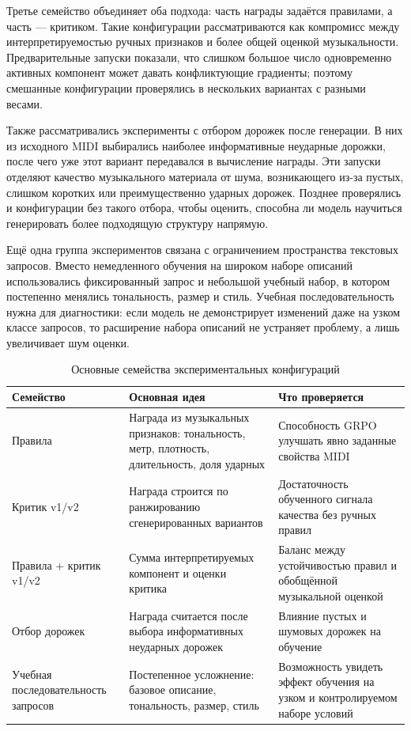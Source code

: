\documentclass[a4paper,12pt]{extarticle}
\begin{document}
Третье семейство объединяет оба подхода: часть награды задаётся правилами, а
часть --- критиком. Такие конфигурации рассматриваются как компромисс между
интерпретируемостью ручных признаков и более общей оценкой музыкальности.
Предварительные запуски показали, что слишком большое число одновременно
активных компонент может давать конфликтующие градиенты; поэтому смешанные
конфигурации проверялись в нескольких вариантах с разными весами.

Также рассматривались эксперименты с отбором дорожек после генерации.
В них из исходного MIDI выбирались наиболее информативные неударные дорожки,
после чего уже этот вариант передавался в вычисление награды. Эти запуски
отделяют качество музыкального материала от шума, возникающего из-за
пустых, слишком коротких или преимущественно ударных дорожек. Позднее
проверялись и конфигурации без такого отбора, чтобы оценить, способна ли
модель научиться генерировать более подходящую структуру напрямую.

Ещё одна группа экспериментов связана с ограничением пространства текстовых
запросов. Вместо немедленного обучения на широком наборе
описаний использовались фиксированный запрос и небольшой учебный набор,
в котором постепенно менялись тональность, размер и стиль. Учебная
последовательность нужна для диагностики: если модель не демонстрирует
изменений даже на узком классе запросов, то расширение набора описаний не
устраняет проблему, а лишь увеличивает шум оценки.

\begin{table}[h]
\centering
\caption{Основные семейства экспериментальных конфигураций}
\label{tab:experiment-families}
\begin{tabular}{|p{}|p{}|p{}|}
\hline
\textbf{Семейство} & \textbf{Основная идея} & \textbf{Что проверяется} \\
\hline
Правила & Награда из музыкальных признаков: тональность, метр, плотность,
длительность, доля ударных & Способность GRPO улучшать явно заданные
свойства MIDI \\
\hline
Критик v1/v2 & Награда строится по ранжированию сгенерированных вариантов &
Достаточность обученного сигнала качества без ручных правил \\
\hline
Правила + критик v1/v2 & Сумма интерпретируемых компонент и оценки критика &
Баланс между устойчивостью правил и обобщённой музыкальной оценкой \\
\hline
Отбор дорожек & Награда считается после выбора информативных неударных
дорожек & Влияние пустых и шумовых дорожек на обучение \\
\hline
Учебная последовательность запросов & Постепенное усложнение: базовое
описание, тональность, размер, стиль & Возможность увидеть эффект обучения
на узком и контролируемом наборе условий \\
\hline
\end{tabular}
\end{table}
\end{document}
